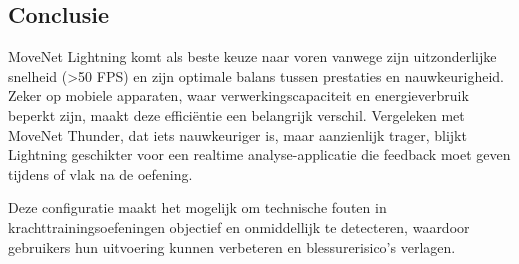 \subsection{Conclusie}
MoveNet Lightning komt als beste keuze naar voren vanwege zijn uitzonderlijke snelheid (>50 FPS) en zijn optimale balans tussen prestaties en nauwkeurigheid. 
Zeker op mobiele apparaten, waar verwerkingscapaciteit en energieverbruik beperkt zijn, maakt deze efficiëntie een belangrijk verschil. 
Vergeleken met MoveNet Thunder, dat iets nauwkeuriger is, maar aanzienlijk trager, blijkt Lightning geschikter voor een realtime analyse-applicatie die feedback moet geven tijdens of vlak na de oefening.

\medskip

Deze configuratie maakt het mogelijk om technische fouten in krachttrainingsoefeningen objectief en onmiddellijk te detecteren, waardoor gebruikers hun uitvoering kunnen verbeteren en blessurerisico’s verlagen.